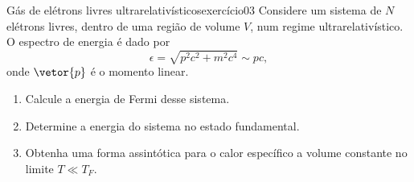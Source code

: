 \begin{exercício}{Gás de elétrons livres ultrarelativísticos}{exercício03}
    Considere um sistema de \(N\) elétrons livres, dentro de uma região de volume \(V\), num regime ultrarelativístico. O espectro de energia é dado por
    \begin{equation*}
        \epsilon = \sqrt{p^2 c^2 + m^2 c^4} \sim pc,
    \end{equation*}
    onde \(\vetor{p}\) é o momento linear.
    \begin{enumerate}[label=(\alph*)]
        \item Calcule a energia de Fermi desse sistema.
        \item Determine a energia do sistema no estado fundamental.
        \item Obtenha uma forma assintótica para o calor específico a volume constante no limite \(T \ll T_F\).
    \end{enumerate}
\end{exercício}

